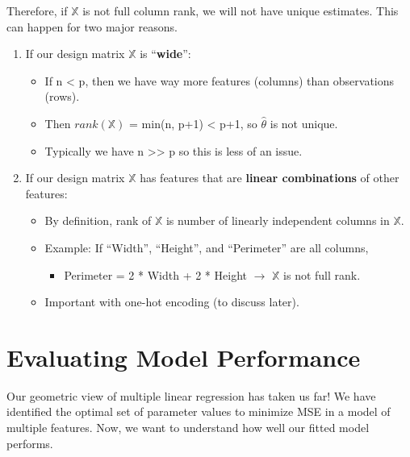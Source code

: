 \documentclass[
  letterpaper,
  DIV=11,
  numbers=noendperiod]{scrreprt}
\providecommand{\tightlist}{%
  \setlength{\itemsep}{0pt}\setlength{\parskip}{0pt}}\usepackage{longtable,booktabs,array}
\begin{document}
Therefore, if \(\mathbb{X}\) is not full column rank, we will not have
unique estimates. This can happen for two major reasons.

\begin{enumerate}
\def\labelenumi{\arabic{enumi}.}
\tightlist
\item
  If our design matrix \(\mathbb{X}\) is ``\textbf{wide}'':

  \begin{itemize}
  \tightlist
  \item
    If n \textless{} p, then we have way more features (columns) than
    observations (rows).
  \item
    Then \(rank(\mathbb{X})\) = min(n, p+1) \textless{} p+1, so
    \(\hat{\theta}\) is not unique.
  \item
    Typically we have n \textgreater\textgreater{} p so this is less of
    an issue.
  \end{itemize}
\item
  If our design matrix \(\mathbb{X}\) has features that are
  \textbf{linear combinations} of other features:

  \begin{itemize}
  \tightlist
  \item
    By definition, rank of \(\mathbb{X}\) is number of linearly
    independent columns in \(\mathbb{X}\).
  \item
    Example: If ``Width'', ``Height'', and ``Perimeter'' are all
    columns,

    \begin{itemize}
    \tightlist
    \item
      Perimeter = 2 * Width + 2 * Height \(\rightarrow\) \(\mathbb{X}\)
      is not full rank.
    \end{itemize}
  \item
    Important with one-hot encoding (to discuss later).
  \end{itemize}
\end{enumerate}

\section{Evaluating Model
Performance}\label{evaluating-model-performance}

Our geometric view of multiple linear regression has taken us far! We
have identified the optimal set of parameter values to minimize MSE in a
model of multiple features. Now, we want to understand how well our
fitted model performs.
\end{document}

